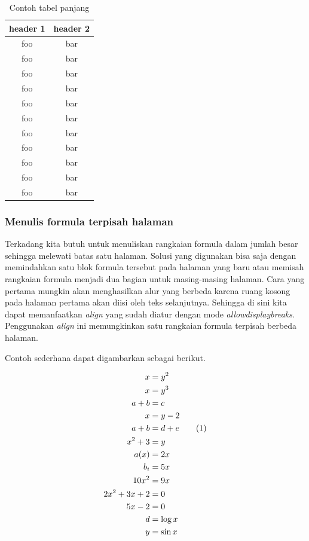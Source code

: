 \begin{longtable}{| c | c |} 
	\caption{Contoh tabel panjang}
	\label{tab:myfirstlongtable} \\
	\hline
	header 1 & header 2 \\
	\hline \hline
	foo & bar \\ \hline 
	foo & bar \\ \hline
	foo & bar \\ \hline
	foo & bar \\ \hline
	foo & bar \\ \hline
	foo & bar \\ \hline
	foo & bar \\ \hline
	foo & bar \\ \hline
	foo & bar \\ \hline
	foo & bar \\ \hline
	foo & bar \\ \hline
\end{longtable}


\subsubsection{Menulis formula terpisah halaman}

Terkadang kita butuh untuk menuliskan rangkaian formula dalam jumlah besar sehingga melewati batas satu halaman. Solusi yang digunakan bisa saja dengan memindahkan satu blok formula tersebut pada halaman yang baru atau memisah rangkaian formula menjadi dua bagian untuk masing-masing halaman. Cara yang pertama mungkin akan menghasilkan alur yang berbeda karena ruang kosong pada halaman pertama akan diisi oleh teks selanjutnya. Sehingga di sini kita dapat memanfaatkan \textit{align} yang sudah diatur dengan mode \textit{allowdisplaybreaks}. Penggunakan \textit{align} ini memungkinkan satu rangkaian formula terpisah berbeda halaman. 

Contoh sederhana dapat digambarkan sebagai berikut.

\begin{align*}
	x &= y^2\\
	x &= y^3\\
	a + b &= c\\
	x &= y - 2\\
	a + b &= d + e \tag{\stepcounter{equation}\theequation}\\
	x^2 + 3 &= y\\
	a(x) &= 2x\\
	b_i &= 5x\\
	10x^2 &= 9x\\
	2x^2 + 3x + 2 &= 0\\
	5x - 2 &= 0\\
	d &= \log x\\
	y &= \sin x
\end{align*}

